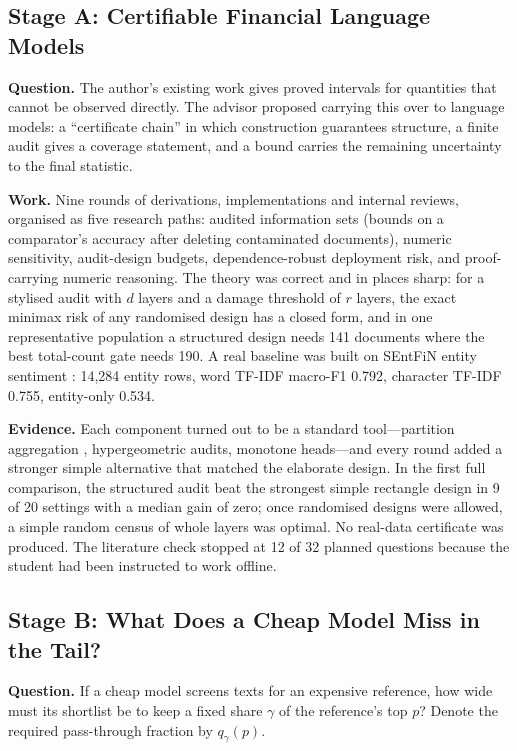 \documentclass[11pt]{article}
\begin{document}
\subsection{Stage A: Certifiable Financial Language Models}

\textbf{Question.} The author's existing work gives proved intervals for quantities that cannot be observed directly. The advisor proposed carrying this over to language models: a ``certificate chain'' in which construction guarantees structure, a finite audit gives a coverage statement, and a bound carries the remaining uncertainty to the final statistic.

\textbf{Work.} Nine rounds of derivations, implementations and internal reviews, organised as five research paths: audited information sets (bounds on a comparator's accuracy after deleting contaminated documents), numeric sensitivity, audit-design budgets, dependence-robust deployment risk, and proof-carrying numeric reasoning. The theory was correct and in places sharp: for a stylised audit with $d$ layers and a damage threshold of $r$ layers, the exact minimax risk of any randomised design has a closed form, and in one representative population a structured design needs 141 documents where the best total-count gate needs 190. A real baseline was built on SEntFiN entity sentiment \citep{sinha2022sentfin}: 14,284 entity rows, word TF-IDF macro-F1 0.792, character TF-IDF 0.755, entity-only 0.534.

\textbf{Evidence.} Each component turned out to be a standard tool---partition aggregation \citep{levine2021deep}, hypergeometric audits, monotone heads---and every round added a stronger simple alternative that matched the elaborate design. In the first full comparison, the structured audit beat the strongest simple rectangle design in 9 of 20 settings with a median gain of zero; once randomised designs were allowed, a simple random census of whole layers was optimal. No real-data certificate was produced. The literature check stopped at 12 of 32 planned questions because the student had been instructed to work offline.

\subsection{Stage B: What Does a Cheap Model Miss in the Tail?}

\textbf{Question.} If a cheap model screens texts for an expensive reference, how wide must its shortlist be to keep a fixed share $\gamma$ of the reference's top $p$? Denote the required pass-through fraction by $q_\gamma(p)$.
\end{document}
